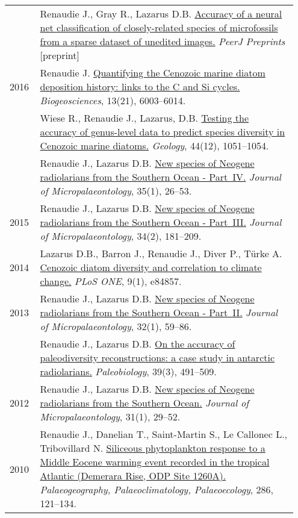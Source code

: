 \documentclass[11pt, a4paper]{article}
\begin{document}
\begin{longtable}{@{}p{0.1\linewidth} >{\small}P{0.85\linewidth}@{}}
    & Renaudie J., Gray R., Lazarus D.B. \href{https://peerj.com/preprints/27328/}{Accuracy of a neural net classification of closely-related species of microfossils from a sparse dataset of unedited images.} \textit{PeerJ Preprints} [preprint] \\
2016 & Renaudie J. \href{http://dx.doi.org/10.5194/bg-13-6003-2016}{Quantifying the Cenozoic marine diatom deposition history: links to the C and Si cycles.} \textit{Biogeosciences}, 13(21), 6003--6014.\\
    & Wiese R., Renaudie J., Lazarus, D.B. \href{http://dx.doi.org/10.1130/G38347.1}{Testing the accuracy of genus-level data to predict species diversity in Cenozoic marine diatoms.} \textit{Geology}, 44(12), 1051--1054.\\
    & Renaudie J., Lazarus D.B. \href{http://dx.doi.org/10.1144/jmpaleo2014-026}{New species of Neogene radiolarians from the Southern Ocean - Part IV.} \textit{Journal of Micropalaeontology}, 35(1), 26--53.\\
2015 & Renaudie J., Lazarus D.B. \href{http://dx.doi.org/10.1144/jmpaleo2013-034}{New species of Neogene radiolarians from the Southern Ocean - Part III.} \textit{Journal of Micropalaeontology}, 34(2), 181--209.\\
2014 & Lazarus D.B., Barron J., Renaudie J., Diver P., Türke A. \href{http://dx.doi.org/10.1371/journal.pone.0084857}{Cenozoic diatom diversity and correlation to climate change.} \textit{PLoS ONE}, 9(1), e84857.\\
2013 & Renaudie J., Lazarus D.B. \href{http://dx.doi.org/10.1144/jmpaleo2011-025}{New species of Neogene radiolarians from the Southern Ocean - Part II.} \textit{Journal of Micropalaeontology}, 32(1), 59--86.\\
    & Renaudie J., Lazarus D.B. \href{http://dx.doi.org/10.1666/12016}{On the accuracy of paleodiversity reconstructions: a case study in antarctic radiolarians.} \textit{Paleobiology}, 39(3), 491--509.\\
2012 & Renaudie J., Lazarus D.B. \href{http://dx.doi.org/10.1144/0262-821X10-026}{New species of Neogene radiolarians from the Southern Ocean.} \textit{Journal of Micropalaeontology}, 31(1), 29--52.\\
2010 & Renaudie J., Danelian T., Saint-Martin S., Le Callonec L., Tribovillard N. \href{http://dx.doi.org/10.1016/j.palaeo.2009.12.004}{Siliceous phytoplankton response to a Middle Eocene warming event recorded in the tropical Atlantic (Demerara Rise, ODP Site 1260A).} \textit{Palaeogeography, Palaeoclimatology, Palaeoecology}, 286, 121--134.\\
\end{longtable}
\end{document}
